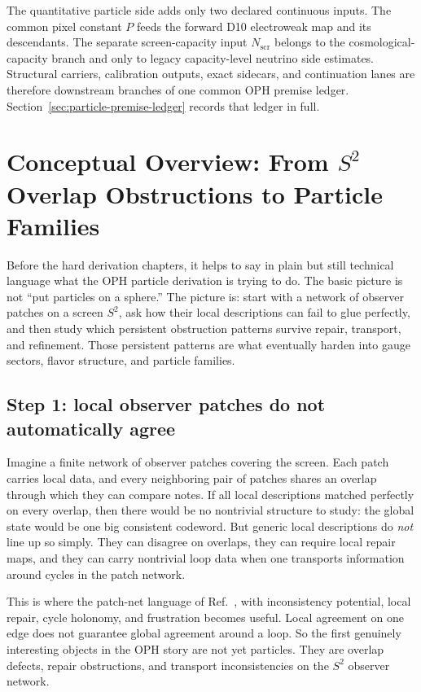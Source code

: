 \documentclass[11pt]{article}
\begin{document}
The quantitative particle side adds only two declared continuous inputs. The common pixel constant
\(P\) feeds the forward D10 electroweak map and its descendants. The separate screen-capacity
input \(N_{\mathrm{scr}}\) belongs to the cosmological-capacity branch and only to legacy
capacity-level neutrino side estimates. Structural carriers, calibration outputs, exact sidecars, and continuation
lanes are therefore downstream branches of one common OPH premise ledger. Section~\ref{sec:particle-premise-ledger}
records that ledger in full.

\section{Conceptual Overview: From \texorpdfstring{$S^2$}{S2} Overlap Obstructions to Particle Families}

Before the hard derivation chapters, it helps to say in plain but still technical language what
the OPH particle derivation is trying to do. The basic picture is not ``put particles on a
sphere.'' The picture is: start with a network of observer patches on a screen \(S^2\), ask how
their local descriptions can fail to glue perfectly, and then study which persistent obstruction
patterns survive repair, transport, and refinement. Those persistent patterns
are what eventually harden into gauge sectors, flavor structure, and particle families.

\subsection{Step 1: local observer patches do not automatically agree}

Imagine a finite network of observer patches covering the screen. Each patch carries local data,
and every neighboring pair of patches shares an overlap through which they can compare notes. If
all local descriptions matched perfectly on every overlap, then there would be no nontrivial
structure to study: the global state would be one big consistent codeword. But generic local
descriptions do \emph{not} line up so simply. They can disagree on overlaps, they can require
local repair maps, and they can carry nontrivial loop data when one transports information around
cycles in the patch network.

This is where the patch-net language of Ref.~\cite{ophconsensus}, with inconsistency potential, local repair, cycle
holonomy, and frustration becomes useful. Local agreement on one edge does not guarantee global
agreement around a loop. So the first genuinely interesting objects in the OPH story are not yet
particles. They are overlap defects, repair obstructions, and transport inconsistencies on the
\(S^2\) observer network.
\end{document}
